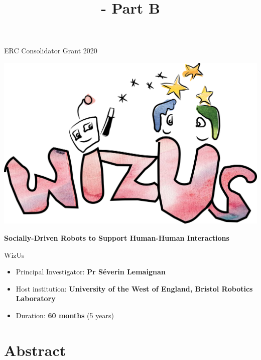 \documentclass[11pt,a4paper]{report}
\title{\project - Part B}
\newcommand{\project}{WizUs\xspace}
\newcommand{\eu}[1]{}
\begin{document}
\maketitle

\begin{center}
    ERC Consolidator Grant 2020

    \vspace{2cm}
    \includegraphics[width=0.7\linewidth]{logo}

    \textbf{\LARGE Socially-Driven Robots to Support Human-Human Interactions}

    \vspace{2cm}
    {\Huge \project}

\end{center}

    \vspace{1cm}

\begin{itemize}
    \item Principal Investigator: \textbf{Pr Séverin Lemaignan}
    \item Host institution: \textbf{University of the West of England, Bristol Robotics
        Laboratory}
    \item Duration: \textbf{60 months} (5 years)
\end{itemize}

\section*{Abstract}\label{abstract}

\eu{The abstract (summary) should, at a glance, provide the reader with a clear
understanding of the objectives of the research proposal and how they will be
achieved. The abstract will be used as the short description of your research
proposal in the evaluation process and in communications to contact in
particular the potential remote referees and/or inform the Commission and/or the
programme management committees and/or relevant national funding agencies
(provided you give permission to do so where requested in the online proposal
submission forms, section 1). It must therefore be short and precise and should
not contain confidential information. \\
Please use plain typed text, avoiding formulae and other special characters. The
abstract must be written in English. There is a limit of 2000 characters (spaces
and line breaks included).}
\end{document}
